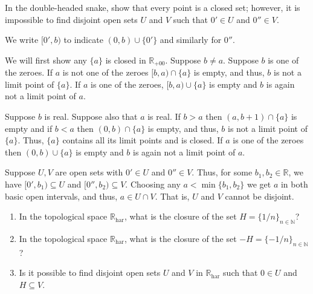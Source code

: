 \documentclass[12 pt, letterpaper]{hmcpset}
\begin{document}
\pagebreak

\begin{problem}[3.8]
	In the double-headed snake, show that every point is a closed set; however, it is impossible to find disjoint open sets $U$ and $V$ such that $0' \in U$ and $0'' \in V$.
\end{problem}

\begin{solution}
	We write $[0', b)$ to indicate $(0, b) \cup \{ 0' \}$ and similarly for $0''$.

	We will first show any $\{ a \}$ is closed in $\mathbb{R}_{+00}$. Suppose $b \neq a$. Suppose $b$ is one of the zeroes. If $a$ is not one of the zeroes $[b, a) \cap \{ a \}$ is empty, and thus, $b$ is not a limit point of $\{ a \}$. If $a$ is one of the zeroes, $[b, a) \cup \{ a \}$ is empty and $b$ is again not a limit point of $a$.

	Suppose $b$ is real. Suppose also that $a$ is real. If $b > a$ then $(a, b + 1) \cap \{ a \}$ is empty and if $b < a$ then $(0, b) \cap \{ a \}$ is empty, and thus, $b$ is not a limit point of $\{ a \}$. Thus, $\{ a \}$ contains all its limit points and is closed. If $a$ is one of the zeroes then $(0, b) \cup \{ a \}$ is empty and $b$ is again not a limit point of $a$.

	Suppose $U, V$ are open sets with $0' \in U$ and $0'' \in V$. Thus, for some $b_{1}, b_{2} \in \mathbb{R}$, we have $[0', b_{1}) \subseteq U$ and $[0'', b_{2}) \subseteq V$. Choosing any $a < \min \{ b_{1}, b_{2} \}$ we get $a$ in both basic open intervals, and thus, $a \in U \cap V$. That is, $U$ and $V$ cannot be disjoint.
\end{solution}

\pagebreak

\begin{problem}[3.9]
	\begin{enumerate}
		\item In the topological space $\mathbb{R}_{\text{har}}$, what is the closure of the set $H = \{ 1/n \}_{n \in \mathbb{N}}$?
		\item In the topological space $\mathbb{R}_{\text{har}}$, what is the closure of the set $-H = \{ -1/n \}_{n \in \mathbb{N}}$?
		\item Is it possible to find disjoint open sets $U$ and $V$ in $\mathbb{R}_{\text{har}}$ such that $0 \in U$ and $H \subseteq V$.
	\end{enumerate}
\end{problem}
\end{document}
